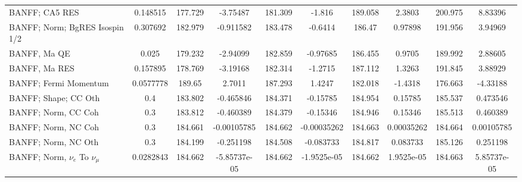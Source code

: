 \documentclass{standalone}
\begin{document}
\begin{tabular}{| l | S | S  S | S  S | S  S | S  S | }
                                                                  BANFF; CA5 RES &        0.148515 &         177.729 &        -3.75487 &         181.309 &          -1.816 &         189.058 &          2.3803 &         200.975 &         8.83396 \\ 
                                                  BANFF; Norm; BgRES Isospin 1/2 &        0.307692 &         182.979 &       -0.911582 &         183.478 &         -0.6414 &          186.47 &         0.97898 &         191.956 &         3.94969 \\ 
                                                                    BANFF, Ma QE &           0.025 &         179.232 &        -2.94099 &         182.859 &        -0.97685 &         186.455 &          0.9705 &         189.992 &         2.88605 \\ 
                                                                   BANFF, Ma RES &        0.157895 &         178.769 &        -3.19168 &         182.314 &         -1.2715 &         187.112 &          1.3263 &         191.845 &         3.88929 \\ 
                                                           BANFF; Fermi Momentum &       0.0577778 &          189.65 &          2.7011 &         187.293 &          1.4247 &         182.018 &         -1.4318 &         176.663 &        -4.33188 \\ 
                                                            BANFF; Shape; CC Oth &             0.4 &         183.802 &       -0.465846 &         184.371 &        -0.15785 &         184.954 &         0.15785 &         185.537 &        0.473546 \\ 
                                                             BANFF; Norm, CC Coh &             0.3 &         183.812 &       -0.460389 &         184.379 &        -0.15346 &         184.946 &         0.15346 &         185.513 &        0.460389 \\ 
                                                             BANFF; Norm, NC Coh &             0.3 &         184.661 &     -0.00105785 &         184.662 &     -0.00035262 &         184.663 &      0.00035262 &         184.664 &      0.00105785 \\ 
                                                             BANFF; Norm, NC Oth &             0.3 &         184.199 &       -0.251198 &         184.508 &       -0.083733 &         184.817 &        0.083733 &         185.126 &        0.251198 \\ 
                                           BANFF; Norm, $\nu_{e}$ To $\nu_{\mu}$ &       0.0282843 &         184.662 &    -5.85737e-05 &         184.662 &     -1.9525e-05 &         184.662 &      1.9525e-05 &         184.663 &     5.85737e-05 \\ 

\end{tabular}
\end{document}
